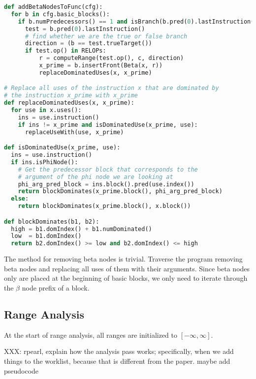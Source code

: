 \documentclass{article}
\begin{document}
\begin{lstlisting}[language=Python,
                   caption={Pseudocode algorithm for inserting beta nodes},
                   label={lst:add_betas}]
def addBetaNodesToFunc(cfg):
  for b in cfg.basic_blocks():
    if b.numPredecessors() == 1 and isBranch(b.pred(0).lastInstruction()):
      test = b.pred(0).lastInstruction()
      # find whether we are the true or false branch
      direction = (b == test.trueTarget())
      if test.op() in RELOPs:
          r = computeRange(test.op(), c, direction)
          x_prime = b.insertFront(Beta(x, r))
          replaceDominatedUses(x, x_prime)

# Replace all uses of the instruction x that are dominated by
# the instruction x_prime with x_prime
def replaceDominatedUses(x, x_prime):
  for use in x.uses():
    ins = use.instruction()
    if ins != x_prime and isDominatedUse(x_prime, use):
      replaceUseWith(use, x_prime)

def isDominatedUse(x_prime, use):
  ins = use.instruction()
  if ins.isPhiNode():
    # Get the predecessor block that corresponds to the
    # argument of the phi node we are looking at
    phi_arg_pred_block = ins.block().pred(use.index())
    return blockDominates(x_prime.block(), phi_arg_pred_block)
  else:
    return blockDominates(x_prime.block(), x.block())

def blockDominates(b1, b2):
  high = b1.domIndex() + b1.numDominated()
  low  = b1.domIndex()
  return b2.domIndex() >= low and b2.domIndex() <= high
\end{lstlisting}

The method for removing beta nodes is trivial. Traverse the program
removing beta nodes and replacing all uses of them with their
arguments. Since beta nodes only are placed at the beginning of basic
blocks, we only need to iterate through the $\beta$ node prefix of a
block.

\subsection{Range Analysis}

At the start of range analysis, all ranges are initialized to
$[-\infty, \infty]$.

XXX: rpearl, explain how the analysis pass works; specifically, when
we add things to the worklist, because that is different from the
paper. maybe add pseudocode
\end{document}
